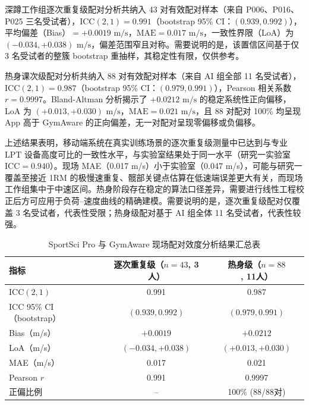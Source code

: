 \documentclass[UTF8,zihao=-4,twoside,openany]{ctexbook}
\begin{document}
深蹲工作组逐次重复级配对分析共纳入 43 对有效配对样本（来自 P006、P016、P025 三名受试者），$\text{ICC}(2,1) = 0.991$（bootstrap 95\% CI：$(0.939, 0.992)$），平均偏差（Bias）$= +0.0019\text{ m/s}$，$\text{MAE} = 0.017\text{ m/s}$，一致性界限（LoA）为 $(-0.034, +0.038)\text{ m/s}$，偏差范围窄且对称。需要说明的是，该置信区间基于仅 3 名受试者的整簇 bootstrap 重抽样，其稳定性有限，仅供参考。

热身课次级配对分析共纳入 88 对有效配对样本（来自 AI 组全部 11 名受试者），$\text{ICC}(2,1) = 0.987$（bootstrap 95\% CI：$(0.979, 0.991)$），Pearson 相关系数 $r = 0.9997$。Bland-Altman 分析揭示了 $+0.0212\text{ m/s}$ 的稳定系统性正向偏移，LoA 为 $(+0.013, +0.030)\text{ m/s}$，$\text{MAE} = 0.021\text{ m/s}$，且 88 对配对 100\% 均呈现 App 高于 GymAware 的正向偏差，无一对配对呈现零偏移或负偏移。

上述结果表明，移动端系统在真实训练场景的逐次重复级测量中已达到与专业 LPT 设备高度可比的一致性水平，与实验室结果处于同一水平（研究一实验室 $\text{ICC} = 0.940$）。现场 MAE（0.017 m/s）小于实验室（0.047 m/s），可能与研究一覆盖至接近 1RM 的极慢速重复、髋部关键点估算在低速端误差更大有关，而现场工作组集中于中速区间。热身阶段存在稳定的算法口径差异，需要进行线性工程校正后方可应用于负荷--速度曲线的精确建模。需要说明的是，逐次重复级配对仅覆盖 3 名受试者，代表性受限；热身级配对基于 AI 组全体 11 名受试者，代表性较强。

\begin{table}[htbp]
  \centering
  \caption{SportSci Pro 与 GymAware 现场配对效度分析结果汇总表}
  \label{tab:ch4-field-valid}
  \vspace{6pt}
  \small
  \begin{tabularx}{\textwidth}{lcc}
    \toprule
    \textbf{指标} & \textbf{逐次重复级（$n=43$, 3人）} & \textbf{热身级（$n=88$, 11人）} \\
    \midrule
    $\text{ICC}(2,1)$ & 0.991 & 0.987 \\
    ICC 95\% CI（bootstrap） & $(0.939, 0.992)$ & $(0.979, 0.991)$ \\
    Bias（m/s） & $+0.0019$ & $+0.0212$ \\
    LoA（m/s） & $(-0.034, +0.038)$ & $(+0.013, +0.030)$ \\
    MAE（m/s） & 0.017 & 0.021 \\
    Pearson $r$ & 0.991 & 0.9997 \\
    正偏比例 & -- & 100\% (88/88对) \\
    \bottomrule
  \end{tabularx}
\end{table}
\end{document}
